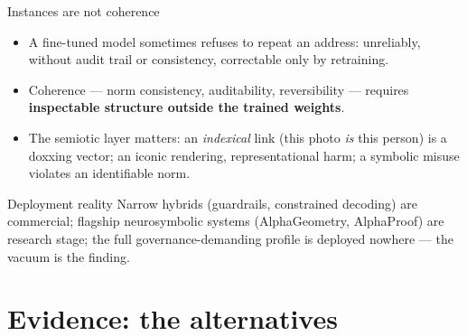 \documentclass[11pt]{beamer}
\begin{document}
\begin{frame}{Instances are not coherence}
  \begin{itemize}
    \item A fine-tuned model sometimes refuses to repeat an address:
          unreliably, without audit trail or consistency, correctable only
          by retraining.
    \item Coherence --- norm consistency, auditability, reversibility ---
          requires \textbf{inspectable structure outside the trained weights}.
    \item The semiotic layer matters: an \emph{indexical} link (this photo
          \emph{is} this person) is a doxxing vector; an iconic rendering,
          representational harm; a symbolic misuse violates an identifiable
          norm.
  \end{itemize}
  \begin{block}{Deployment reality}\small
    Narrow hybrids (guardrails, constrained decoding) are commercial;
    flagship neurosymbolic systems (AlphaGeometry, AlphaProof) are research
    stage; the full governance-demanding profile is deployed
    \alert{nowhere} --- the vacuum is the finding.
  \end{block}
\end{frame}

\section{Evidence: the alternatives}
\end{document}
